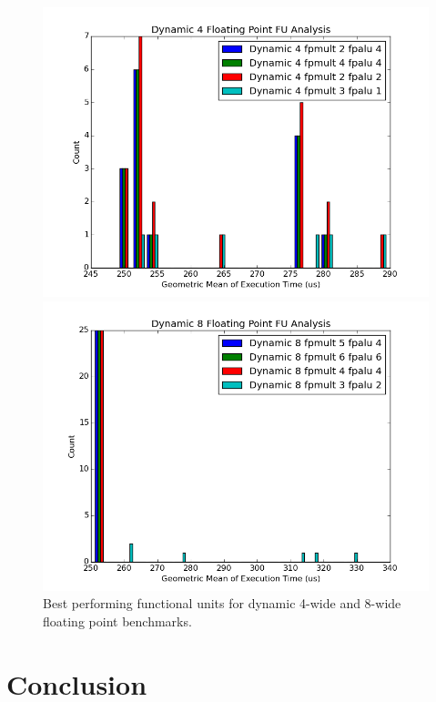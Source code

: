 \documentclass[paper=a4, fontsize=12pt]{scrartcl} %
\numberwithin{equation}{section} %
\numberwithin{figure}{section} %
\numberwithin{table}{section} %
\begin{document}
\begin{figure}
\centering
\begin{minipage}{0.5\textwidth}
\centering
	\includegraphics[width=\linewidth]{graphs/Functional_Units/hardware_float/Dynamic_4_Floating_Point_FU_Analysis.png}
\end{minipage}\hfill
\begin{minipage}{0.5\textwidth}
\centering
 \includegraphics[width=\linewidth]{graphs/Functional_Units/hardware_float/Dynamic_8_Floating_Point_FU_Analysis.png}
\end{minipage}

\caption{Best performing functional units for dynamic 4-wide and 8-wide floating point benchmarks.}
\label{fig:hardware_float}
\end{figure}


\section{Conclusion}
\end{document}

